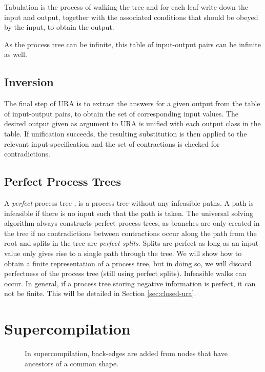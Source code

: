 \documentclass[10pt]{../sigplanconf}
\begin{document}
Tabulation is the process of walking the tree and for each leaf write
down the input and output, together with the associated conditions
that should be obeyed by the input, to obtain the output.

As the process tree can be infinite, this table of input-output pairs
can be infinite as well.

\subsection{Inversion}
The final step of URA is to extract the answers for a given output
from the table of input-output pairs, to obtain the set of
corresponding input values. The desired output given as argument to
URA is unified with each output class in the table. If unification
succeeds, the resulting substitution is then applied to the relevant
input-specification and the set of contractions is checked for
contradictions.

\subsection{Perfect Process Trees}
A \textit{perfect} process tree \cite{gluck1993occam}, is a process
tree without any infeasible paths. A path is infeasible if there is no
input such that the path is taken. The universal solving algorithm
always constructs perfect process trees, as branches are only created
in the tree if no contradictions between contractions occur along the
path from the root and splits in the tree are \textit{perfect
  splits}. Splits are perfect as long as an input value only gives
rise to a single path through the tree. We will show how to obtain a
finite representation of a process tree, but in doing so, we will
discard perfectness of the process tree (still using perfect
splits). Infeasible walks can occur. In general, if a process tree
storing negative information is perfect, it can not be finite. This
will be detailed in Section \ref{sec:closed-ura}.

\section{Supercompilation}
\label{sec:supercompilation}
\begin{figure}
  \centering
\caption{In supercompilation, back-edges are added from nodes that
  have ancestors of a common shape.}
  \label{fig:backedge}
\end{figure}
\end{document}
